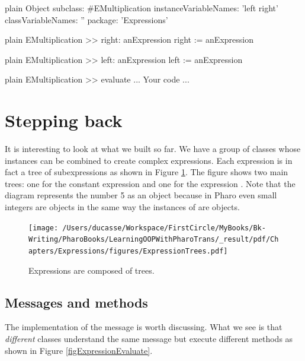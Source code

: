\documentclass[10pt,twoside,english]{_support/latex/sbabook/sbabook}
\begin{document}
\begin{displaycode}{plain}
Object subclass: #EMultiplication
	instanceVariableNames: 'left right'
	classVariableNames: ''
	package: 'Expressions'
\end{displaycode}

\begin{displaycode}{plain}
EMultiplication >> right: anExpression
	right := anExpression
\end{displaycode}

\begin{displaycode}{plain}
EMultiplication >> left: anExpression
	left := anExpression
\end{displaycode}

\begin{displaycode}{plain}
EMultiplication >> evaluate
	... Your code ...
\end{displaycode}
\section{Stepping back }
It is interesting to look at what we built so far. We have a group of classes whose instances can be combined to create complex expressions. Each expression is in fact a tree of subexpressions as shown in Figure \ref{fig:ExpressionTrees}. The figure shows two main trees: one  for the constant expression  and one for the expression . Note that the diagram represents the number 5 as an object because in Pharo even small integers are objects in the same way the instances of  are objects. 


\begin{figure}

\begin{center}
\texttt{[image: /Users/ducasse/Workspace/FirstCircle/MyBooks/Bk-Writing/PharoBooks/LearningOOPWithPharoTrans/\_result/pdf/Chapters/Expressions/figures/ExpressionTrees.pdf]}\caption{Expressions are composed of trees.\label{fig:ExpressionTrees}}\end{center}
\end{figure}

\subsection{Messages and methods}
The implementation of the  message is worth discussing. What we see is that \textit{different} classes understand the same message but execute different methods as shown in Figure \ref{figExpressionEvaluate}.
\end{document}
